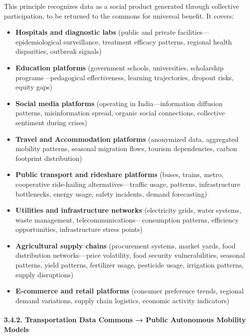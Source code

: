 This principle recognizes data as a social product generated through
collective participation, to be returned to the commons for universal
benefit. It covers:

\begin{itemize}
\tightlist
\item
  \textbf{Hospitals and diagnostic labs} (public and private
  facilities---epidemiological surveillance, treatment efficacy
  patterns, regional health disparities, outbreak signals)
\item
  \textbf{Education platforms} (government schools, universities,
  scholarship programs---pedagogical effectiveness, learning
  trajectories, dropout risks, equity gaps)
\item
  \textbf{Social media platforms} (operating in India---information
  diffusion patterns, misinformation spread, organic social connections,
  collective sentiment during crises)
\item
  \textbf{Travel and Accommodation platforms} (anonymized data,
  aggregated mobility patterns, seasonal migration flows, tourism
  dependencies, carbon footprint distribution)
\item
  \textbf{Public transport and rideshare platforms} (buses, trains,
  metro, cooperative ride-hailing alternatives---traffic usage,
  patterns, infrastructure bottlenecks, energy usage, safety incidents,
  demand forecasting)
\item
  \textbf{Utilities and infrastructure networks} (electricity grids,
  water systems, waste management, telecommunications---consumption
  patterns, efficiency opportunities, infrastructure stress points)
\item
  \textbf{Agricultural supply chains} (procurement systems, market
  yards, food distribution networks---price volatility, food security
  vulnerabilities, seasonal patterns, yield patterns, fertilizer usage,
  pesticide usage, irrigation patterns, supply disruptions)
\item
  \textbf{E-commerce and retail platforms} (consumer preference trends,
  regional demand variations, supply chain logistics, economic activity
  indicators)
\end{itemize}

\paragraph{3.4.2. Transportation Data Commons → Public Autonomous
Mobility
Models}\label{transportation-data-commons-public-autonomous-mobility-models}

